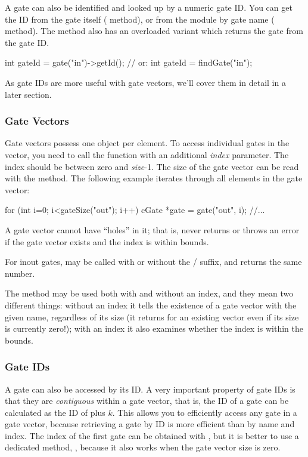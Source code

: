 A gate can also be identified and looked up by a numeric gate ID.
You can get the ID from the gate itself ( method),
or from the module by gate name ( method).
The  method also has an overloaded variant which
returns the gate from the gate ID.

\begin{cpp}
int gateId = gate("in")->getId();  // or:
int gateId = findGate("in");
\end{cpp}

As gate IDs are more useful with gate vectors, we'll cover them
in detail in a later section.


\subsubsection{Gate Vectors}

Gate vectors possess one  object per element.
To access individual gates in the vector, you need to call
the  function with an additional \textit{index}
parameter. The index should be between zero and \textit{size}-1.
The size of the gate vector can be read with the 
method. The following example iterates through all elements in the
gate vector:

\begin{cpp}
for (int i=0; i<gateSize("out"); i++) {
    cGate *gate = gate("out", i);
    //...
}
\end{cpp}

A gate vector cannot have ``holes'' in it; that is, 
never returns  or throws an error if the gate vector exists
and the index is within bounds.

For inout gates,  may be called with or without
the / suffix, and returns the same number.

The  method may be used both with and without an
index, and they mean two different things: without an index it tells
the existence of a gate vector with the given name, regardless of its
size (it returns  for an existing vector even if its size
is currently zero!); with an index it also examines whether the index
is within the bounds.


\subsubsection{Gate IDs}

A gate can also be accessed by its ID. A very important property of gate IDs
is that they are \textit{contiguous} within a gate vector, that is,
the ID of a gate  can be calculated as the ID of  plus $k$.
This allows you to efficiently access any gate in a gate vector, because
retrieving a gate by ID is more efficient than by name and index.
The index of the first gate can be obtained with ,
but it is better to use a dedicated method, ,
because it also works when the gate vector size is zero.

